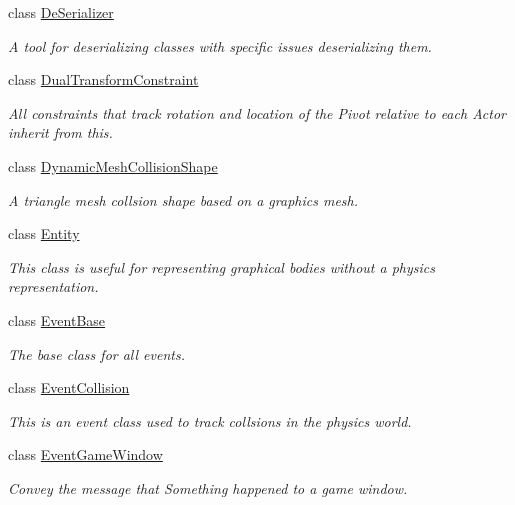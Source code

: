 \begin{DoxyCompactItemize}
class \hyperlink{classMezzanine_1_1DeSerializer}{DeSerializer}
\begin{DoxyCompactList}\small\item\em A tool for deserializing classes with specific issues deserializing them. \item\end{DoxyCompactList}\item 
class \hyperlink{classMezzanine_1_1DualTransformConstraint}{DualTransformConstraint}
\begin{DoxyCompactList}\small\item\em All constraints that track rotation and location of the Pivot relative to each Actor inherit from this. \item\end{DoxyCompactList}\item 
class \hyperlink{classMezzanine_1_1DynamicMeshCollisionShape}{DynamicMeshCollisionShape}
\begin{DoxyCompactList}\small\item\em A triangle mesh collsion shape based on a graphics mesh. \item\end{DoxyCompactList}\item 
class \hyperlink{classMezzanine_1_1Entity}{Entity}
\begin{DoxyCompactList}\small\item\em This class is useful for representing graphical bodies without a physics representation. \item\end{DoxyCompactList}\item 
class \hyperlink{classMezzanine_1_1EventBase}{EventBase}
\begin{DoxyCompactList}\small\item\em The base class for all events. \item\end{DoxyCompactList}\item 
class \hyperlink{classMezzanine_1_1EventCollision}{EventCollision}
\begin{DoxyCompactList}\small\item\em This is an event class used to track collsions in the physics world. \item\end{DoxyCompactList}\item 
class \hyperlink{classMezzanine_1_1EventGameWindow}{EventGameWindow}
\begin{DoxyCompactList}\small\item\em Convey the message that Something happened to a game window. \item\end{DoxyCompactList}\item 

\end{DoxyCompactItemize}
